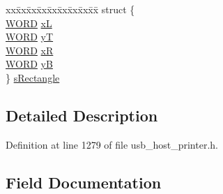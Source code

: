 \begin{DoxyCompactItemize}
\begin{tabbing}
\end{tabbing}\item 
\begin{tabbing}
xx\=xx\=xx\=xx\=xx\=xx\=xx\=xx\=xx\=\kill
struct \{\\
\>\hyperlink{_generic_type_defs_8h_a2b0e863dadf920709ec53d9088ee7c91}{WORD} \hyperlink{union_u_s_b___p_r_i_n_t_e_r___g_r_a_p_h_i_c_s___p_a_r_a_m_e_t_e_r_s_aada8306cbdf26e506656fef86efd5374}{xL}\\
\>\hyperlink{_generic_type_defs_8h_a2b0e863dadf920709ec53d9088ee7c91}{WORD} \hyperlink{union_u_s_b___p_r_i_n_t_e_r___g_r_a_p_h_i_c_s___p_a_r_a_m_e_t_e_r_s_a949864b828dc476d6108029a6586084d}{yT}\\
\>\hyperlink{_generic_type_defs_8h_a2b0e863dadf920709ec53d9088ee7c91}{WORD} \hyperlink{union_u_s_b___p_r_i_n_t_e_r___g_r_a_p_h_i_c_s___p_a_r_a_m_e_t_e_r_s_a0feea1fb4c8ce38636c979c21274d699}{xR}\\
\>\hyperlink{_generic_type_defs_8h_a2b0e863dadf920709ec53d9088ee7c91}{WORD} \hyperlink{union_u_s_b___p_r_i_n_t_e_r___g_r_a_p_h_i_c_s___p_a_r_a_m_e_t_e_r_s_a75f3fc106ada28aab0c4a192326006c8}{yB}\\
\} \hyperlink{union_u_s_b___p_r_i_n_t_e_r___g_r_a_p_h_i_c_s___p_a_r_a_m_e_t_e_r_s_a64f59c2ebd6ca311794199bd2149af1a}{sRectangle}\\

\end{tabbing}\end{DoxyCompactItemize}


\subsection{Detailed Description}


Definition at line 1279 of file usb\+\_\+host\+\_\+printer.\+h.



\subsection{Field Documentation}
\hypertarget{union_u_s_b___p_r_i_n_t_e_r___g_r_a_p_h_i_c_s___p_a_r_a_m_e_t_e_r_s_aaf6d8142a594dcaafbd9f1f58ecc848e}{}
